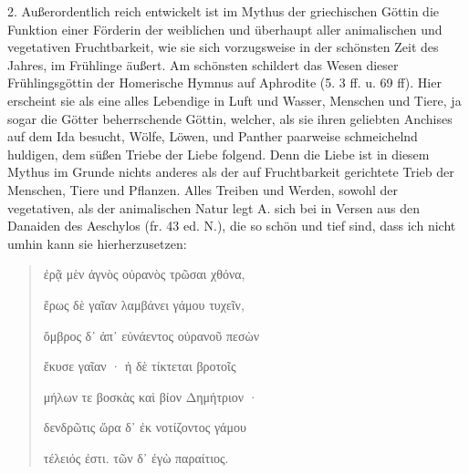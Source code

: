 \documentclass[a4paper, 11pt, oneside]{article}
\begin{document}
2. Außerordentlich reich entwickelt ist im Mythus der griechischen Göttin die Funktion einer Förderin der weiblichen und überhaupt aller animalischen und vegetativen Fruchtbarkeit, wie sie sich vorzugsweise in der schönsten Zeit des Jahres, im Frühlinge äußert. Am schönsten schildert das Wesen dieser Frühlingsgöttin der Homerische Hymnus auf Aphrodite (5. 3 ff. u. 69 ff). Hier erscheint sie als eine alles Lebendige in Luft und Wasser, Menschen und Tiere, ja sogar die Götter beherrschende Göttin, welcher, als sie ihren geliebten Anchises auf dem Ida besucht, Wölfe, Löwen, und Panther paarweise schmeichelnd huldigen, dem süßen Triebe der Liebe folgend. Denn die Liebe ist in diesem Mythus im Grunde nichts anderes als der auf Fruchtbarkeit gerichtete Trieb der Menschen, Tiere und Pflanzen. Alles Treiben und Werden, sowohl der vegetativen, als der animalischen Natur legt A. sich bei in Versen aus den Danaiden des Aeschylos (fr. 43 ed. N.), die so schön und tief sind, dass ich nicht umhin kann sie hierherzusetzen:
\begin{quotation}\large
ἐρᾷ μὲν ἁγνὸς οὐρανὸς τρῶσαι χθόνα,

ἔρως δὲ γαῖαν λαμβάνει γάμου τυχεῖν,

ὄμβρος δ᾽ ἀπ᾽ εὐνάεντος οὐρανοῦ πεσὼν

ἔκυσε γαῖαν · ἡ δὲ τίκτεται βροτοῖς

μήλων τε βοσκὰς καὶ βίον Δημήτριον ·

δενδρῶτις ὥρα δ᾽ ἐκ νοτίζοντος γάμου

τέλειός ἐστι. τῶν δ᾽ ἐγὼ παραίτιος.
\end{quotation}
\end{document}
